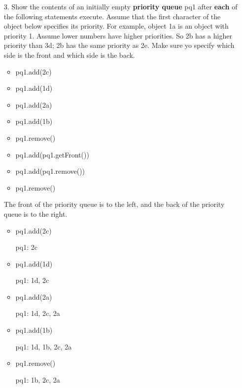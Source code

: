 \documentclass[10pt]{article}
\begin{document}
\begin{enumerate}
		\item[3.] Show the contents of an initially empty \textbf{priority queue} pq1 after \textbf{each} of the following statements execute. Assume that the first character of the object below specifies its priority. For example, object 1a is an object with priority 1. Assume lower numbers have higher priorities. So 2b has a higher priority than 3d; 2b has the same priority as 2e. Make sure yo specify which side is the front and which side is the back.
			
			\begin{itemize}
				\item pq1.add(2c)
				
				\item pq1.add(1d)
				
				\item pq1.add(2a)
				
				\item pq1.add(1b)
				
				\item pq1.remove()
				
				\item pq1.add(pq1.getFront())
				
				\item pq1.add(pq1.remove())
				
				\item pq1.remove()
			\end{itemize}
			
			\vspace{0.5cm}
			The front of the priority queue is to the left, and the back of the priority queue is to the right.
			
			\begin{itemize}
				\item pq1.add(2c)
					
					pq1: 2c
				
				\item pq1.add(1d)
					
					pq1: 1d, 2c
				
				\item pq1.add(2a)
					
					pq1: 1d, 2c, 2a
				
				\item pq1.add(1b)
					
					pq1: 1d, 1b, 2c, 2a
				
				\item pq1.remove()
					
					pq1: 1b, 2c, 2a
				

\end{itemize}
\end{enumerate}
\end{document}
